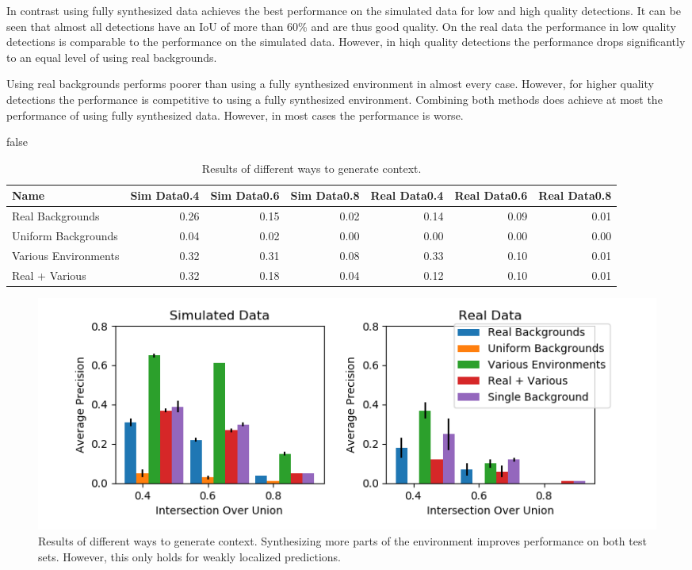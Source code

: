In contrast using fully synthesized data achieves the best performance on the simulated data for low and high quality detections. It can be seen that almost all detections have an \ac{IoU} of more than 60\% and are thus good quality. On the real data the performance in low quality detections is comparable to the performance on the simulated data. However, in hiqh quality detections the performance drops significantly to an equal level of using real backgrounds.

Using real backgrounds performs poorer than using a fully synthesized environment in almost every case. However, for higher quality detections the performance is competitive to using a fully synthesized environment. Combining both methods does achieve at most the performance of using fully synthesized data. However, in most cases the performance is worse.   

\if false
\begin{table}[htbp]
	\caption{Results of different ways to generate context.}
	\begin{tabular}{lrrrrrr}
		\hline
		Name &  Sim Data0.4 &  Sim Data0.6 &  Sim Data0.8 &  Real Data0.4 &  Real Data0.6 &  Real Data0.8 \\
		\hline
		Real Backgrounds &         0.26 &         0.15 &         0.02 &          0.14 &          0.09 &          0.01 \\
		Uniform Backgrounds &         0.04 &         0.02 &         0.00 &          0.00 &          0.00 &          0.00 \\
		Various Environments &         0.32 &         0.31 &         0.08 &          0.33 &          0.10 &          0.01 \\
		Real + Various &         0.32 &         0.18 &         0.04 &          0.12 &          0.10 &          0.01 \\
		\hline
	\end{tabular}
	\label{tab:context}
\end{table}
\fi
\begin{figure}[htbp]
	\includegraphics[width=\textwidth]{fig/context_bar}
	\caption{Results of different ways to generate context. Synthesizing more parts of the environment improves performance on both test sets. However, this only holds for weakly localized predictions.}
	\label{fig:context}
\end{figure}

